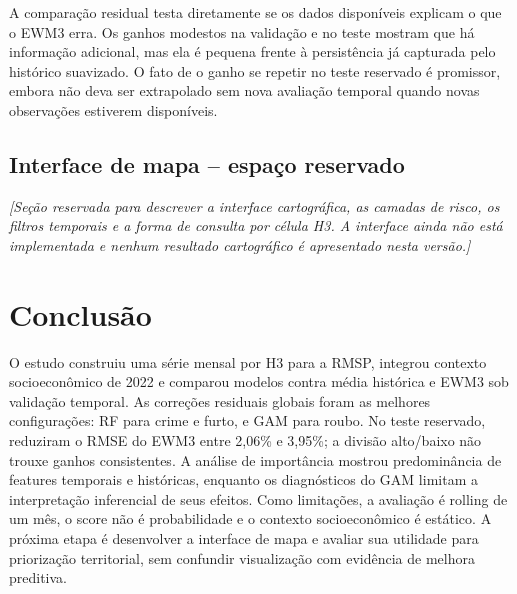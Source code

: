 \documentclass[12pt]{article}
\begin{document}
A comparação residual testa diretamente se os dados disponíveis explicam o que o EWM3 erra. Os ganhos modestos na validação e no teste mostram que há informação adicional, mas ela é pequena frente à persistência já capturada pelo histórico suavizado. O fato de o ganho se repetir no teste reservado é promissor, embora não deva ser extrapolado sem nova avaliação temporal quando novas observações estiverem disponíveis.

\subsection{Interface de mapa -- espaço reservado}

\textit{[Seção reservada para descrever a interface cartográfica, as camadas de risco, os filtros temporais e a forma de consulta por célula H3. A interface ainda não está implementada e nenhum resultado cartográfico é apresentado nesta versão.]}

\section{Conclusão}

O estudo construiu uma série mensal por H3 para a RMSP, integrou contexto socioeconômico de 2022 e comparou modelos contra média histórica e EWM3 sob validação temporal. As correções residuais globais foram as melhores configurações: RF para crime e furto, e GAM para roubo. No teste reservado, reduziram o RMSE do EWM3 entre 2,06\% e 3,95\%; a divisão alto/baixo não trouxe ganhos consistentes. A análise de importância mostrou predominância de features temporais e históricas, enquanto os diagnósticos do GAM limitam a interpretação inferencial de seus efeitos. Como limitações, a avaliação é rolling de um mês, o score não é probabilidade e o contexto socioeconômico é estático. A próxima etapa é desenvolver a interface de mapa e avaliar sua utilidade para priorização territorial, sem confundir visualização com evidência de melhora preditiva.



\end{document}
